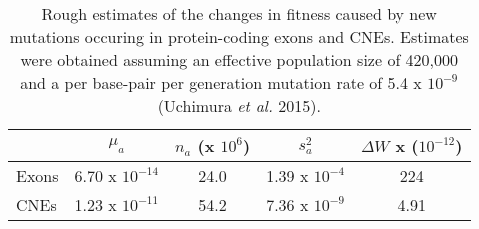


\begin{table}
\centering

\caption{Rough estimates of the changes in fitness caused by new mutations occuring in protein-coding exons and CNEs. Estimates were obtained assuming an effective population size of 420,000 and a per base-pair per generation mutation rate of 5.4 x $10^{-9}$ (Uchimura \textit{et al.} 2015).}
 \begin{tabular}{l c c c c} 

  \hline
		& $\mu_a$  & $n_a$ (x $10^6$)& $s_a^2$ & $\Delta W$ x ($10^{-12}$) \\ [0.5ex] \hline
	Exons & 6.70 x $10^{-14}$ & 24.0 & 1.39 x $10^{-4}$ & 224 \\
	CNEs  & 1.23 x $10^{-11}$ & 54.2 & 7.36 x $10^{-9}$ & 4.91 \\ \hline
\end{tabular}    
    \label{t}

\end{table}
